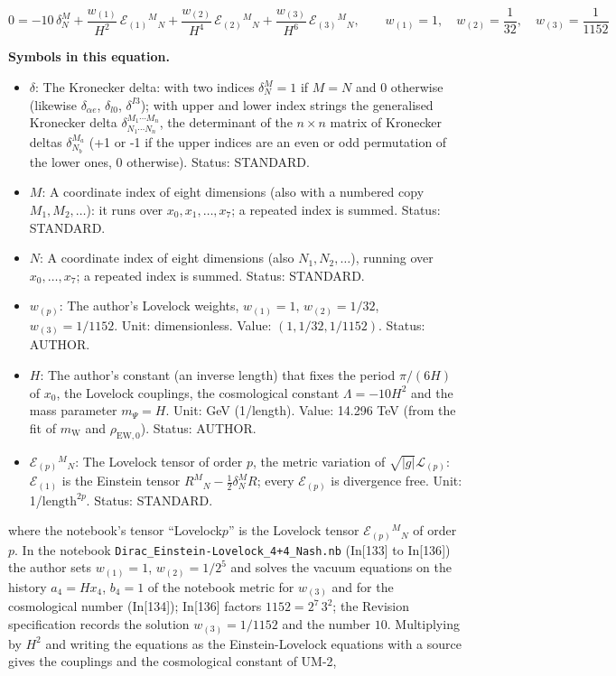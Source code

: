 \documentclass[
  10pt,
]{article}
\providecommand{\tightlist}{%
  \setlength{\itemsep}{0pt}\setlength{\parskip}{0pt}}
\begin{document}
\[
0 = -10\,\delta^M_N + \frac{w_{(1)}}{H^2}\,\mathcal{E}_{(1)}{}^M{}_N + \frac{w_{(2)}}{H^4}\,\mathcal{E}_{(2)}{}^M{}_N
 + \frac{w_{(3)}}{H^6}\,\mathcal{E}_{(3)}{}^M{}_N,\qquad
w_{(1)} = 1,\quad w_{(2)} = \frac{1}{32},\quad w_{(3)} = \frac{1}{1152}
\]

\textbf{Symbols in this equation.}

\begin{itemize}
\tightlist
\item
  \(\delta\): The Kronecker delta: with two indices \(\delta^M_N = 1\)
  if \(M = N\) and 0 otherwise (likewise \(\delta_{\alpha e}\),
  \(\delta_{l0}\), \(\delta^{I3}\)); with upper and lower index strings
  the generalised Kronecker delta
  \(\delta^{M_1\cdots M_n}_{N_1\cdots N_n}\), the determinant of the
  \(n \times n\) matrix of Kronecker deltas \(\delta^{M_a}_{N_b}\) (+1
  or -1 if the upper indices are an even or odd permutation of the lower
  ones, 0 otherwise). Status: STANDARD.
\item
  \(M\): A coordinate index of eight dimensions (also with a numbered
  copy \(M_1, M_2, \dots\)): it runs over \(x_0, x_1, \dots, x_7\); a
  repeated index is summed. Status: STANDARD.
\item
  \(N\): A coordinate index of eight dimensions (also
  \(N_1, N_2, \dots\)), running over \(x_0, \dots, x_7\); a repeated
  index is summed. Status: STANDARD.
\item
  \(w_{(p)}\): The author's Lovelock weights, \(w_{(1)} = 1\),
  \(w_{(2)} = 1/32\), \(w_{(3)} = 1/1152\). Unit: dimensionless. Value:
  \((1, 1/32, 1/1152)\). Status: AUTHOR.
\item
  \(H\): The author's constant (an inverse length) that fixes the period
  \(\pi/(6H)\) of \(x_0\), the Lovelock couplings, the cosmological
  constant \(\Lambda = -10H^2\) and the mass parameter \(m_\Psi = H\).
  Unit: GeV (1/length). Value: 14.296 TeV (from the fit of
  \(m_{\mathrm{W}}\) and \(\rho_{\mathrm{EW},0}\)). Status: AUTHOR.
\item
  \(\mathcal{E}_{(p)}{}^M{}_N\): The Lovelock tensor of order \(p\), the
  metric variation of \(\sqrt{\lvert g\rvert}\mathcal{L}_{(p)}\):
  \(\mathcal{E}_{(1)}\) is the Einstein tensor
  \(R^M{}_N - \frac12\delta^M_NR\); every \(\mathcal{E}_{(p)}\) is
  divergence free. Unit: 1/\(\mathrm{length}^{2p}\). Status: STANDARD.
\end{itemize}

where the notebook's tensor ``Lovelock\(p\)'' is the Lovelock tensor
\(\mathcal{E}_{(p)}{}^M{}_N\) of order \(p\). In the notebook
\texttt{Dirac\_Einstein-Lovelock\_4+4\_Nash.nb} (In{[}133{]} to
In{[}136{]}) the author sets \(w_{(1)} = 1\), \(w_{(2)} = 1/2^5\) and
solves the vacuum equations on the history \(a_4 = Hx_4\), \(b_4 = 1\)
of the notebook metric for \(w_{(3)}\) and for the cosmological number
(In{[}134{]}); In{[}136{]} factors \(1152 = 2^7\,3^2\); the Revision
specification records the solution \(w_{(3)} = 1/1152\) and the number
\(10\). Multiplying by \(H^2\) and writing the equations as the
Einstein-Lovelock equations with a source gives the couplings and the
cosmological constant of UM-2,
\end{document}
